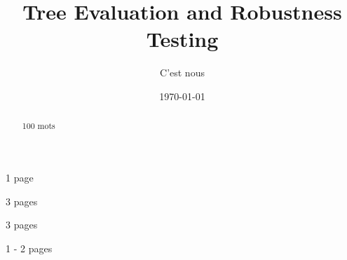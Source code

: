 \documentclass[a4paper,12pt]{article}
\title{Tree Evaluation and Robustness Testing}
\author{C'est nous}
\begin{document}

\date{\today}
\maketitle

\begin{abstract}
100 mots
\end{abstract}

\tableofcontents



 1 page %

 3 pages %

 3 pages %

% 

 1 - 2 pages %




\end{document}
